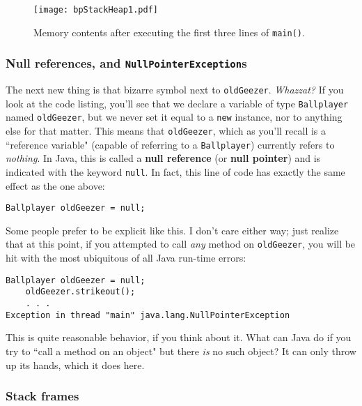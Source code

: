 \begin{figure}[ht]   %
\centering
\texttt{[image: bpStackHeap1.pdf]}
\caption{Memory contents after executing the first three lines of
\texttt{main()}.}
\label{fig:bpStackHeap1}
\end{figure}

\subsubsection{Null references, and \texttt{NullPointerException}s}

The next new thing is that bizarre symbol next to \texttt{oldGeezer}.
\textit{Whazzat?} If you look at the code listing, you'll see that we
declare a variable of type \texttt{Ballplayer} named \texttt{oldGeezer}, but
we never set it equal to a \texttt{new} instance, nor to anything else for
that matter. This means that \texttt{oldGeezer}, which as you'll recall is a
``reference variable" (capable of referring to a \texttt{Ballplayer})
currently refers to \textit{nothing}. In Java, this is called a \textbf{null
reference} (or \textbf{null pointer}) and is indicated with the keyword
\texttt{null}. In fact, this line of code has exactly the same effect as the
one above:

\begin{Verbatim}[fontsize=\small,samepage=true]
Ballplayer oldGeezer = null;
\end{Verbatim}

Some people prefer to be explicit like this. I don't care either way; just
realize that at this point, if you attempted to call \textit{any} method on
\texttt{oldGeezer}, you will be hit with the most ubiquitous of all Java
run-time errors:

\begin{Verbatim}[fontsize=\small,samepage=true]
    Ballplayer oldGeezer = null;
    oldGeezer.strikeout();
    . . .
Exception in thread "main" java.lang.NullPointerException
\end{Verbatim}

This is quite reasonable behavior, if you think about it. What can Java do if
you try to ``call a method on an object" but there \textit{is} no such object?
It can only throw up its hands, which it does here.

\subsubsection{Stack frames}

